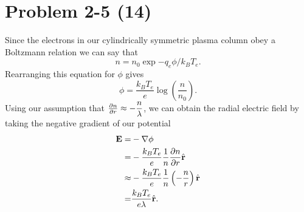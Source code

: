 \section*{Problem 2-5 (14)}
\label{sec:2-5}
Since the electrons in our cylindrically symmetric plasma column obey a Boltzmann relation we can say that
\begin{equation}
	n = n_0\exp{-q_e\phi/k_BT_e}.
\end{equation}
Rearranging this equation for \(\phi \) gives
\begin{equation}
	\phi = \dfrac{k_BT_e}{e}\log(\dfrac{n}{n_0}).
\end{equation}
Using our assumption that \(\frac{\partial n}{\partial r} \approx -\dfrac{n}{\lambda} \), we can obtain the radial electric field by taking the negative gradient of our potential
\begin{align}
	\textbf{E} =& -\nabla \phi\\
	=& -\dfrac{k_BT_e}{e}\dfrac{1}{n}\frac{\partial n}{\partial r}\hat{\textbf{r}} \\
	\approx& -\dfrac{k_BT_e}{e}\dfrac{1}{n}\left(-\dfrac{n}{r}\right)\hat{\textbf{r}} \\
	=& \dfrac{k_BT_e}{e\lambda}\hat{\textbf{r}}.
\end{align}

